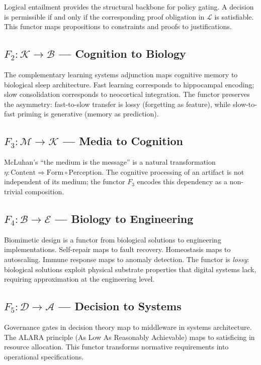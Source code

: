 \documentclass[11pt,a4paper]{article}
\begin{document}
Logical entailment provides the structural backbone for policy gating. A decision is permissible if and only if the corresponding proof obligation in $\mathcal{L}$ is satisfiable. This functor maps propositions to constraints and proofs to justifications.

\subsection{$F_2: \mathcal{K} \to \mathcal{B}$ --- Cognition to Biology}

The complementary learning systems adjunction maps cognitive memory to biological sleep architecture. Fast learning corresponds to hippocampal encoding; slow consolidation corresponds to neocortical integration. The functor preserves the asymmetry: fast-to-slow transfer is lossy (forgetting as feature), while slow-to-fast priming is generative (memory as prediction).

\subsection{$F_3: \mathcal{M} \to \mathcal{K}$ --- Media to Cognition}

McLuhan's ``the medium is the message'' is a natural transformation $\eta: \mathrm{Content} \Rightarrow \mathrm{Form} \circ \mathrm{Perception}$. The cognitive processing of an artifact is not independent of its medium; the functor $F_3$ encodes this dependency as a non-trivial composition.

\subsection{$F_4: \mathcal{B} \to \mathcal{E}$ --- Biology to Engineering}

Biomimetic design is a functor from biological solutions to engineering implementations. Self-repair maps to fault recovery. Homeostasis maps to autoscaling. Immune response maps to anomaly detection. The functor is \emph{lossy}: biological solutions exploit physical substrate properties that digital systems lack, requiring approximation at the engineering level.

\subsection{$F_5: \mathcal{D} \to \mathcal{A}$ --- Decision to Systems}

Governance gates in decision theory map to middleware in systems architecture. The ALARA principle (As Low As Reasonably Achievable) maps to satisficing in resource allocation. This functor transforms normative requirements into operational specifications.
\end{document}
